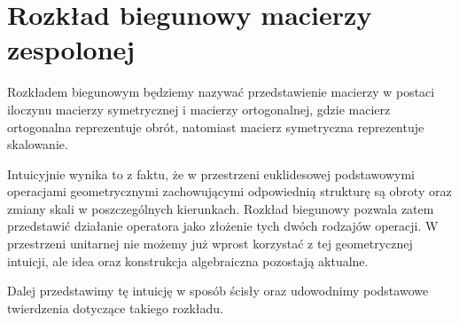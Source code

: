 \section{Rozkład biegunowy macierzy zespolonej}

Rozkładem biegunowym będziemy nazywać przedstawienie macierzy w postaci iloczynu macierzy symetrycznej i macierzy ortogonalnej, gdzie macierz ortogonalna reprezentuje obrót, natomiast macierz symetryczna reprezentuje skalowanie. 

Intuicyjnie wynika to z faktu, że w przestrzeni euklidesowej podstawowymi operacjami geometrycznymi zachowującymi odpowiednią strukturę są obroty oraz zmiany skali w poszczególnych kierunkach.
Rozkład biegunowy pozwala zatem przedstawić działanie operatora jako złożenie tych dwóch rodzajów operacji. W przestrzeni unitarnej nie możemy już wprost korzystać z tej geometrycznej intuicji, ale idea oraz konstrukcja algebraiczna pozostają aktualne.

Dalej przedstawimy tę intuicję w sposób ścisły oraz udowodnimy podstawowe twierdzenia dotyczące takiego rozkładu.

